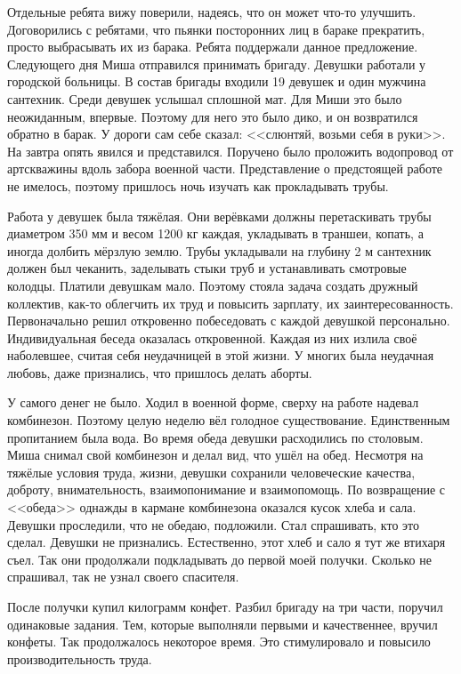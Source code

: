 Отдельные ребята вижу поверили, надеясь, что он может что-то улучшить. Договорились с ребятами, что пьянки посторонних лиц в бараке прекратить, просто выбрасывать их из барака. Ребята поддержали данное предложение. Следующего дня Миша отправился принимать бригаду. Девушки работали у городской больницы. В состав бригады входили 19 девушек и один мужчина сантехник. Среди девушек услышал сплошной мат. Для Миши это было неожиданным, впервые. Поэтому для него это было дико, и он возвратился обратно в барак. У дороги сам себе сказал: <<слюнтяй, возьми себя в руки>>. На завтра опять явился и представился. Поручено было проложить водопровод от артскважины вдоль забора военной части. Представление о предстоящей работе не имелось, поэтому пришлось ночь изучать как прокладывать трубы.

Работа у девушек была тяжёлая. Они верёвками должны перетаскивать трубы диаметром 350 мм и весом 1200 кг каждая, укладывать в траншеи, копать, а иногда долбить мёрзлую землю. Трубы укладывали на глубину 2 м сантехник должен был чеканить, заделывать стыки труб и устанавливать смотровые колодцы. Платили девушкам мало. Поэтому стояла задача создать дружный коллектив, как-то облегчить их труд и повысить зарплату, их заинтересованность. Первоначально решил откровенно побеседовать с каждой девушкой персонально. Индивидуальная беседа оказалась откровенной. Каждая из них излила своё наболевшее, считая себя неудачницей в этой жизни. У многих была неудачная любовь, даже признались, что пришлось делать аборты.

У самого денег не было. Ходил в военной форме, сверху на работе надевал комбинезон. Поэтому целую неделю вёл голодное существование. Единственным пропитанием была вода. Во время обеда девушки расходились по столовым. Миша снимал свой комбинезон и делал вид, что ушёл на обед. Несмотря на тяжёлые условия труда, жизни, девушки сохранили человеческие качества, доброту, внимательность, взаимопонимание и взаимопомощь. По возвращение с <<обеда>> однажды в кармане комбинезона оказался кусок хлеба и сала. Девушки проследили, что не обедаю, подложили. Стал спрашивать, кто это сделал. Девушки не признались. Естественно, этот хлеб и сало я тут же втихаря съел. Так они продолжали подкладывать до первой моей получки. Сколько не спрашивал, так не узнал своего спасителя.

После получки купил килограмм конфет. Разбил бригаду на три части, поручил одинаковые задания. Тем, которые выполняли первыми и качественнее, вручил конфеты. Так продолжалось некоторое время. Это стимулировало и повысило производительность труда.

